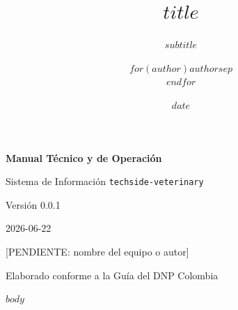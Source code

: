 \documentclass[11pt,oneside]{book}
\title{\textcolor{vetecblue}{$title$}}
\subtitle{$subtitle$}
\author{$for(author)$$author$$sep$ \\ $endfor$}
\date{$date$}
\begin{document}
\begin{titlepage}
  \centering
  \vspace*{2cm}
  {\Huge\bfseries\textcolor{vetecblue}{Manual Técnico y de Operación}\par}
  \vspace{1cm}
  {\LARGE Sistema de Información \texttt{techside-veterinary}\par}
  \vspace{2cm}
  {\Large Versión 0.0.1\par}
  \vspace{0.5cm}
  {\large 2026-06-22\par}
  \vfill
  {\large [PENDIENTE: nombre del equipo o autor]\par}
  \vspace{0.5cm}
  {\normalsize Elaborado conforme a la Guía del DNP Colombia\par}
\end{titlepage}

\tableofcontents
\newpage

$body$
\end{document}
